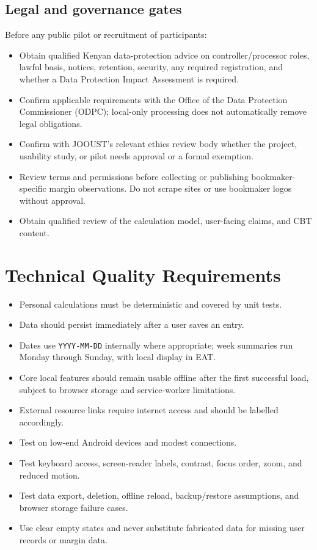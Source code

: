 \documentclass[11pt,a4paper]{article}
\begin{document}
\subsection{Legal and governance gates}
Before any public pilot or recruitment of participants:
\begin{itemize}
  \item Obtain qualified Kenyan data-protection advice on controller/processor roles, lawful basis, notices, retention, security, any required registration, and whether a Data Protection Impact Assessment is required.
  \item Confirm applicable requirements with the Office of the Data Protection Commissioner (ODPC); local-only processing does not automatically remove legal obligations.
  \item Confirm with JOOUST's relevant ethics review body whether the project, usability study, or pilot needs approval or a formal exemption.
  \item Review terms and permissions before collecting or publishing bookmaker-specific margin observations. Do not scrape sites or use bookmaker logos without approval.
  \item Obtain qualified review of the calculation model, user-facing claims, and CBT content.
\end{itemize}

\section{Technical Quality Requirements}

\begin{itemize}
  \item Personal calculations must be deterministic and covered by unit tests.
  \item Data should persist immediately after a user saves an entry.
  \item Dates use \texttt{YYYY-MM-DD} internally where appropriate; week summaries run Monday through Sunday, with local display in EAT.
  \item Core local features should remain usable offline after the first successful load, subject to browser storage and service-worker limitations.
  \item External resource links require internet access and should be labelled accordingly.
  \item Test on low-end Android devices and modest connections.
  \item Test keyboard access, screen-reader labels, contrast, focus order, zoom, and reduced motion.
  \item Test data export, deletion, offline reload, backup/restore assumptions, and browser storage failure cases.
  \item Use clear empty states and never substitute fabricated data for missing user records or margin data.
\end{itemize}
\end{document}
